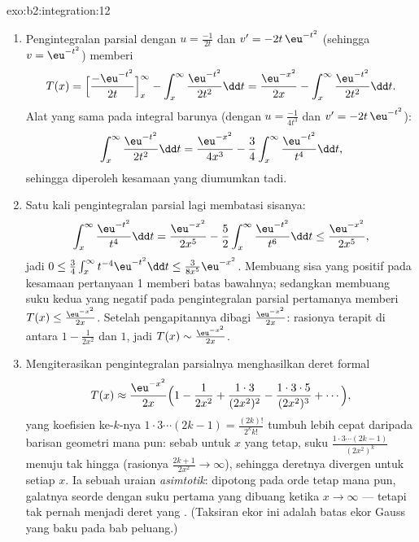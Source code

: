 \begin{solution}{exo:b2:integration:12}
\begin{enumerate}
  \item Pengintegralan parsial dengan $u = \frac{-1}{2t}$ dan $v' =
        -2t\,\eu^{-t^2}$ (sehingga $v = \eu^{-t^2}$) memberi
        \[
        T(x) = \Bigl[\frac{-\eu^{-t^2}}{2t}\Bigr]_x^\infty
        - \int_x^\infty \frac{\eu^{-t^2}}{2t^2}\dd t
        = \frac{\eu^{-x^2}}{2x}
        - \int_x^\infty \frac{\eu^{-t^2}}{2t^2}\dd t .
        \]
        Alat yang sama pada integral barunya (dengan $u = \frac{-1}{4t^3}$
        dan $v' = -2t\,\eu^{-t^2}$):
        \[
        \int_x^\infty \frac{\eu^{-t^2}}{2t^2}\dd t
        = \frac{\eu^{-x^2}}{4x^3}
        - \frac34\int_x^\infty \frac{\eu^{-t^2}}{t^4}\dd t ,
        \]
        sehingga diperoleh kesamaan yang diumumkan tadi.
  \item Satu kali pengintegralan parsial lagi membatasi sisanya:
        \[
        \int_x^\infty \frac{\eu^{-t^2}}{t^4}\dd t
        = \frac{\eu^{-x^2}}{2x^5}
        - \frac52\int_x^\infty\frac{\eu^{-t^2}}{t^6}\dd t
        \leq \frac{\eu^{-x^2}}{2x^5},
        \]
        jadi $0 \leq \frac34\int_x^\infty t^{-4}\eu^{-t^2}\dd t
        \leq \frac{3}{8x^5}\eu^{-x^2}$. Membuang sisa yang positif
        pada kesamaan pertanyaan 1 memberi batas
        bawahnya; sedangkan membuang suku kedua yang negatif pada
        pengintegralan parsial pertamanya memberi $T(x) \leq
        \frac{\eu^{-x^2}}{2x}$. Setelah pengapitannya dibagi
        $\frac{\eu^{-x^2}}{2x}$: rasionya terapit
        di antara $1 - \frac{1}{2x^2}$ dan $1$, jadi $T(x)
        \sim \frac{\eu^{-x^2}}{2x}$.
  \item Mengiterasikan pengintegralan parsialnya menghasilkan deret formal
        \[
        T(x) \approx \frac{\eu^{-x^2}}{2x}\Bigl(1 -
        \frac{1}{2x^2} + \frac{1\cdot3}{(2x^2)^2} -
        \frac{1\cdot3\cdot5}{(2x^2)^3} + \cdots\Bigr),
        \]
        yang koefisien ke-$k$-nya $1\cdot3\cdots(2k-1) =
        \frac{(2k)!}{2^k k!}$ tumbuh lebih cepat daripada barisan
        geometri mana pun: sebab untuk $x$ yang tetap, suku
        $\frac{1\cdot3\cdots(2k-1)}{(2x^2)^k}$ menuju tak hingga
        (rasionya $\frac{2k+1}{2x^2} \to \infty$), sehingga
        deretnya divergen untuk setiap $x$. Ia sebuah uraian
        \emph{asimtotik}: dipotong pada orde tetap mana pun,
        galatnya seorde dengan suku pertama yang dibuang
        ketika $x \to \infty$ --- tetapi tak pernah menjadi deret
        yang . (Taksiran ekor ini adalah batas ekor Gauss
        yang baku pada bab peluang.)
\end{enumerate}
\end{solution}

